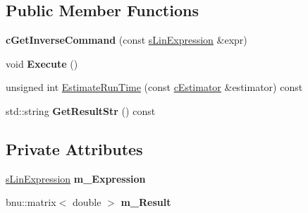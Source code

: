 \subsection*{Public Member Functions}
\begin{DoxyCompactItemize}
\item 
\hypertarget{classengine_1_1cGetInverseCommand_a384a4d0430c07551540f088a52a88dcf}{{\bfseries c\-Get\-Inverse\-Command} (const \hyperlink{structengine_1_1sLinExpression}{s\-Lin\-Expression} \&expr)}\label{classengine_1_1cGetInverseCommand_a384a4d0430c07551540f088a52a88dcf}

\item 
\hypertarget{classengine_1_1cGetInverseCommand_a064982635b21c3cd7a4819300f2afdca}{void {\bfseries Execute} ()}\label{classengine_1_1cGetInverseCommand_a064982635b21c3cd7a4819300f2afdca}

\item 
unsigned int \hyperlink{classengine_1_1cGetInverseCommand_a1ed3cfe7f5d5ec7025da86522d2c69cf}{Estimate\-Run\-Time} (const \hyperlink{classengine_1_1cEstimator}{c\-Estimator} \&estimator) const 
\item 
\hypertarget{classengine_1_1cGetInverseCommand_ab671330e0741d8d0928e44b4b40e68ec}{std\-::string {\bfseries Get\-Result\-Str} () const }\label{classengine_1_1cGetInverseCommand_ab671330e0741d8d0928e44b4b40e68ec}

\end{DoxyCompactItemize}
\subsection*{Private Attributes}
\begin{DoxyCompactItemize}
\item 
\hypertarget{classengine_1_1cGetInverseCommand_a771b16c03fd8d182633108101756e45d}{\hyperlink{structengine_1_1sLinExpression}{s\-Lin\-Expression} {\bfseries m\-\_\-\-Expression}}\label{classengine_1_1cGetInverseCommand_a771b16c03fd8d182633108101756e45d}

\item 
\hypertarget{classengine_1_1cGetInverseCommand_add6d20d33ad723eeedc3ce95721fdbf1}{bnu\-::matrix$<$ double $>$ {\bfseries m\-\_\-\-Result}}\label{classengine_1_1cGetInverseCommand_add6d20d33ad723eeedc3ce95721fdbf1}

\end{DoxyCompactItemize}


